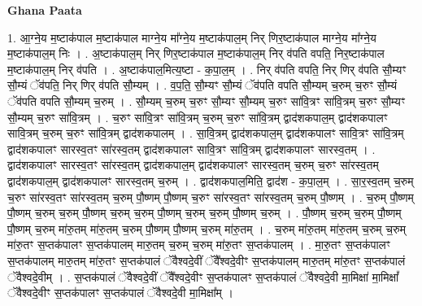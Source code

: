 \documentclass[17pt]{extarticle}
\begin{document}
\textbf{Ghana Paata } \newline

1. आ॒ग्ने॒य म॒ष्टाक॑पाल म॒ष्टाक॑पाल माग्ने॒य मा᳚ग्ने॒य म॒ष्टाक॑पाल॒म् निर् णिर॒ष्टाक॑पाल माग्ने॒य मा᳚ग्ने॒य म॒ष्टाक॑पाल॒म् निः । . अ॒ष्टाक॑पाल॒म् निर् णिर॒ष्टाक॑पाल म॒ष्टाक॑पाल॒म् निर् व॑पति वपति॒ निर॒ष्टाक॑पाल म॒ष्टाक॑पाल॒म् निर् व॑पति । . अ॒ष्टाक॑पाल॒मित्य॒ष्टा - क॒पा॒ल॒म् । . निर् व॑पति वपति॒ निर् णिर् व॑पति सौ॒म्यꣳ सौ॒म्यं ॅव॑पति॒ निर् णिर् व॑पति सौ॒म्यम् । . व॒प॒ति॒ सौ॒म्यꣳ सौ॒म्यं ॅव॑पति वपति सौ॒म्यम् च॒रुम् च॒रुꣳ सौ॒म्यं ॅव॑पति वपति सौ॒म्यम् च॒रुम् । . सौ॒म्यम् च॒रुम् च॒रुꣳ सौ॒म्यꣳ सौ॒म्यम् च॒रुꣳ सा॑वि॒त्रꣳ सा॑वि॒त्रम् च॒रुꣳ सौ॒म्यꣳ सौ॒म्यम् च॒रुꣳ सा॑वि॒त्रम् । . च॒रुꣳ सा॑वि॒त्रꣳ सा॑वि॒त्रम् च॒रुम् च॒रुꣳ सा॑वि॒त्रम् द्वाद॑शकपाल॒म् द्वाद॑शकपालꣳ सावि॒त्रम् च॒रुम् च॒रुꣳ सा॑वि॒त्रम् द्वाद॑शकपालम् । . सा॒वि॒त्रम् द्वाद॑शकपाल॒म् द्वाद॑शकपालꣳ सावि॒त्रꣳ सा॑वि॒त्रम् द्वाद॑शकपालꣳ सारस्व॒तꣳ सा॑रस्व॒तम् द्वाद॑शकपालꣳ सावि॒त्रꣳ सा॑वि॒त्रम् द्वाद॑शकपालꣳ सारस्व॒तम् । . द्वाद॑शकपालꣳ सारस्व॒तꣳ सा॑रस्व॒तम् द्वाद॑शकपाल॒म् द्वाद॑शकपालꣳ सारस्व॒तम् च॒रुम् च॒रुꣳ सा॑रस्व॒तम् द्वाद॑शकपाल॒म् द्वाद॑शकपालꣳ सारस्व॒तम् च॒रुम् । . द्वाद॑शकपाल॒मिति॒ द्वाद॑श - क॒पा॒ल॒म् । . सा॒र॒स्व॒तम् च॒रुम् च॒रुꣳ सा॑रस्व॒तꣳ सा॑रस्व॒तम् च॒रुम् पौ॒ष्णम् पौ॒ष्णम् च॒रुꣳ सा॑रस्व॒तꣳ सा॑रस्व॒तम् च॒रुम् पौ॒ष्णम् । . च॒रुम् पौ॒ष्णम् पौ॒ष्णम् च॒रुम् च॒रुम् पौ॒ष्णम् च॒रुम् च॒रुम् पौ॒ष्णम् च॒रुम् च॒रुम् पौ॒ष्णम् च॒रुम् । . पौ॒ष्णम् च॒रुम् च॒रुम् पौ॒ष्णम् पौ॒ष्णम् च॒रुम् मा॑रु॒तम् मा॑रु॒तम् च॒रुम् पौ॒ष्णम् पौ॒ष्णम् च॒रुम् मा॑रु॒तम् । . च॒रुम् मा॑रु॒तम् मा॑रु॒तम् च॒रुम् च॒रुम् मा॑रु॒तꣳ स॒प्तक॑पालꣳ स॒प्तक॑पालम् मारु॒तम् च॒रुम् च॒रुम् मा॑रु॒तꣳ स॒प्तक॑पालम् । . मा॒रु॒तꣳ स॒प्तक॑पालꣳ स॒प्तक॑पालम् मारु॒तम् मा॑रु॒तꣳ स॒प्तक॑पालं ॅवैश्वदे॒वीं ॅवै᳚श्वदे॒वीꣳ स॒प्तक॑पालम् मारु॒तम् मा॑रु॒तꣳ स॒प्तक॑पालं ॅवैश्वदे॒वीम् । . स॒प्तक॑पालं ॅवैश्वदे॒वीं ॅवै᳚श्वदे॒वीꣳ स॒प्तक॑पालꣳ स॒प्तक॑पालं ॅवैश्वदे॒वी मा॒मिक्षा॑ मा॒मिक्षां᳚ ॅवैश्वदे॒वीꣳ स॒प्तक॑पालꣳ स॒प्तक॑पालं ॅवैश्वदे॒वी मा॒मिक्षा᳚म् । \newline
\end{document}
